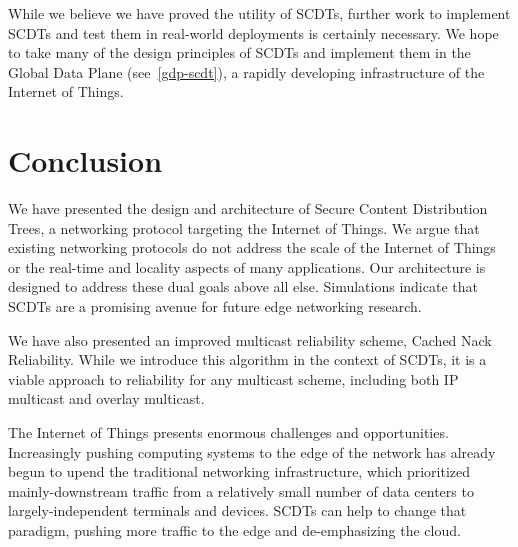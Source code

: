 While we believe we have proved the utility of SCDTs, further work to implement SCDTs and test them in real-world deployments is certainly necessary. We hope to take many of the design principles of SCDTs and implement them in the Global Data Plane (see~\autoref{gdp-scdt}), a rapidly developing infrastructure of the Internet of Things.

\section{Conclusion}
We have presented the design and architecture of Secure Content Distribution Trees, a networking protocol targeting the Internet of Things. We argue that existing networking protocols do not address the scale of the Internet of Things or the real-time and locality aspects of many applications. Our architecture is designed to address these dual goals above all else. Simulations indicate that SCDTs are a promising avenue for future edge networking research.

We have also presented an improved multicast reliability scheme, Cached Nack Reliability. While we introduce this algorithm in the context of SCDTs, it is a viable approach to reliability for any multicast scheme, including both IP multicast and overlay multicast. 

The Internet of Things presents enormous challenges and opportunities. Increasingly pushing computing systems to the edge of the network has already begun to upend the traditional networking infrastructure, which prioritized mainly-downstream traffic from a relatively small number of data centers to largely-independent terminals and devices. SCDTs can help to change that paradigm, pushing more traffic to the edge and de-emphasizing the cloud.
